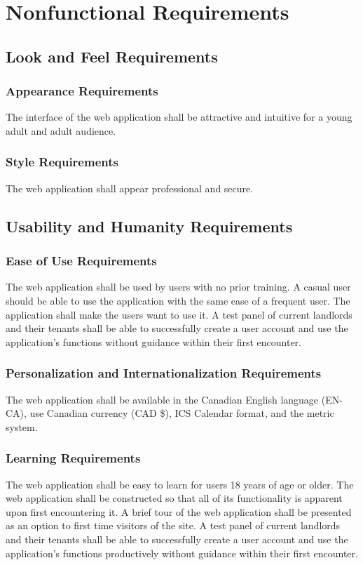 \documentclass[12pt]{article}
\begin{document}
{\section{Nonfunctional Requirements}
\subsection{Look and Feel Requirements}
\subsubsection{Appearance Requirements}
The interface of the web application shall be attractive and intuitive for a 
young adult and adult audience.

\subsubsection{Style Requirements}
The web application shall appear professional and secure.

\subsection{Usability and Humanity Requirements}
\subsubsection{Ease of Use Requirements}
The 
web application shall be used by users with no prior training. A casual user should 
be able to use the application with the same ease of a frequent user. The 
application shall make the users want to use it. A test panel of current 
landlords and their tenants shall be able to successfully create a user account 
and use the application's functions without guidance within their first 
encounter.
\subsubsection{Personalization and Internationalization Requirements}
The web application shall be available in the Canadian English language (EN-CA),  use 
Canadian currency (CAD \$), ICS Calendar format, and the metric system.
\subsubsection{Learning Requirements}
The web application shall be easy to learn for users 18 years of age or older. The web 
application shall be constructed so that all of its functionality is apparent 
upon first encountering it. A brief tour of the web application shall be 
presented as an option to first time visitors of the site. A test panel of 
current landlords and their tenants shall be able to successfully create a user 
account and use the application's functions productively without guidance within 
their first encounter.
}
\end{document}
